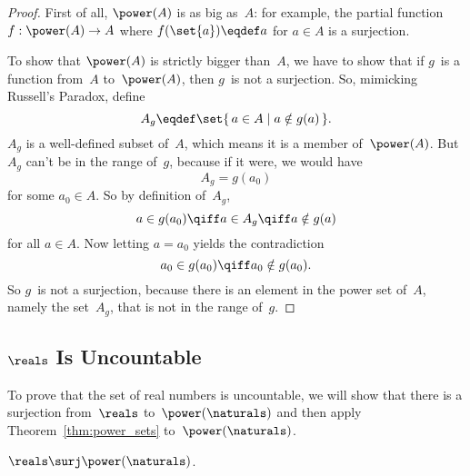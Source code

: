 \begin{proof}

First of all, $\power(A)$ is as big as~$A$: for example, the partial
function $f : \power(A) \to A$ where $f(\set{a}) \eqdef a$ for $a \in
A$ is a surjection.

To show that $\power(A)$ is strictly bigger than~$A$, we have to show
that if $g$~is a function from~$A$ to~$\power(A)$, then $g$~is not a
surjection.  So, mimicking Russell's Paradox, define
\begin{equation*}
    A_g \eqdef \set{\, a \in A \mid a \notin g(a) \,}.
\end{equation*}
$A_g$ is a well-defined subset of~$A$, which means it is a member
of~$\power(A)$.  But $A_g$ can't be in the range of~$g$, because if it
were, we would have
\begin{equation*}
    A_g = g(a_0)
\end{equation*}
for some $a_0 \in A$. So by definition of~$A_g$,
\begin{equation*}
    a \in g(a_0) \qiff a \in A_g \qiff a \notin g(a)
\end{equation*}
for all $a \in A$.  Now letting $a = a_0$ yields the contradiction
\begin{equation*}
    a_0 \in g(a_0) \qiff a_0 \notin g(a_0).
\end{equation*}
So $g$~is not a surjection, because there is an element in the power
set of~$A$, namely the set~$A_g$, that is not in the range of~$g$.
\end{proof}

\subsection{$\reals$ Is Uncountable}

To prove that the set of real numbers is uncountable, we will 
show that there is a surjection from~$\reals$ to~$\power(\naturals)$
and then apply Theorem~\ref{thm:power_sets} to~$\power(\naturals)$.

\begin{lemma}\label{lem:13D7}
$\reals \surj \power(\naturals)$.
\end{lemma}

